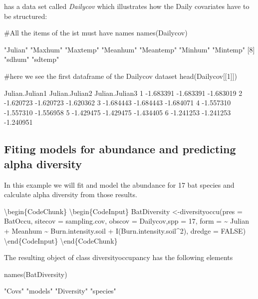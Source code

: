 \documentclass[article]{jss}
\begin{document}
 has a data set called \emph{Dailycov} which
illustrates how the Daily covariates have to be structured:

\begin{CodeChunk}
\begin{CodeInput}
#All the items of the ist must have names
names(Dailycov)
\end{CodeInput}
\begin{CodeOutput}
[1] "Julian"   "Maxhum"   "Maxtemp"  "Meanhum"  "Meantemp" "Minhum"   "Mintemp" 
[8] "sdhum"    "sdtemp"  
\end{CodeOutput}
\begin{CodeInput}
#here we see the first dataframe of the Dailycov dataset
head(Dailycov[[1]])
\end{CodeInput}
\begin{CodeOutput}
  Julian.Julian1 Julian.Julian2 Julian.Julian3
1      -1.683391      -1.683391      -1.683019
2      -1.620723      -1.620723      -1.620362
3      -1.684443      -1.684443      -1.684071
4      -1.557310      -1.557310      -1.556958
5      -1.429475      -1.429475      -1.434405
6      -1.241253      -1.241253      -1.240951
\end{CodeOutput}
\end{CodeChunk}

\subsection{Fiting models for abundance and predicting alpha
diversity}\label{fiting-models-for-abundance-and-predicting-alpha-diversity}

In this example we will fit and model the abundance for 17 bat species
and calculate alpha diversity from those results.

\textbackslash{}begin\{CodeChunk\} \textbackslash{}begin\{CodeInput\}
BatDiversity \textless{}-diversityoccu(pres = BatOccu, sitecov =
sampling.cov, obscov = Dailycov,spp = 17, form = \textasciitilde{}
Julian + Meanhum \textasciitilde{} Burn.intensity.soil +
I(Burn.intensity.soil\^{}2), dredge = FALSE)
\textbackslash{}end\{CodeInput\} \textbackslash{}end\{CodeChunk\}

The resulting object of class diversityoccupancy has the following
elements

\begin{CodeChunk}
\begin{CodeInput}
names(BatDiversity)
\end{CodeInput}
\begin{CodeOutput}
[1] "Covs"      "models"    "Diversity" "species"  
\end{CodeOutput}
\end{CodeChunk}
\end{document}
